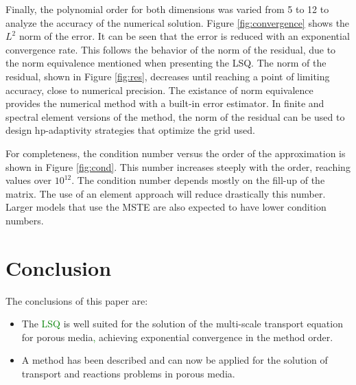 \documentclass{CFD2011}
\newcommand{\TODO}[1]{\textcolor{blue}{TODO: #1} \\}
\newcommand{\newf}[1]{\textcolor{green}{#1}}
\newcommand{\nof}[1]{\textcolor{cyan}{}}
\begin{document}



Finally, the polynomial order for both dimensions was varied from 5 to 12 to analyze the accuracy of the numerical solution. Figure \ref{fig:convergence} shows the $L^2$ norm of the error. It can be seen that the error is reduced with an exponential convergence rate. This follows the behavior of the norm of the residual, due to the norm equivalence mentioned when presenting the LSQ. The norm of the residual, shown in Figure \ref{fig:res}, decreases until reaching a point of limiting accuracy, close to numerical precision. The existance of norm equivalence provides the numerical method with a built-in error estimator. In finite and spectral element versions of the method, the norm of the residual can be used to design hp-adaptivity strategies that optimize the grid used.



For completeness, the condition number versus the order of the approximation is shown in Figure \ref{fig:cond}. This number increases steeply with the order, reaching values over $10^12$. The condition number depends mostly on the fill-up of the matrix. The use of an element approach will reduce drastically this number. Larger models that use the MSTE are also expected to have lower condition numbers.


\section{Conclusion}

The conclusions of this paper are:

\begin{itemize}
\item The \nof{least square high order method}\newf{LSQ} is well suited for the solution of the multi-scale transport equation for porous media\newf{,} achieving exponential convergence in the method order.
\item A method has been described and can now be applied for the solution of transport and reactions problems in porous media.
\end{itemize}
\end{document}
